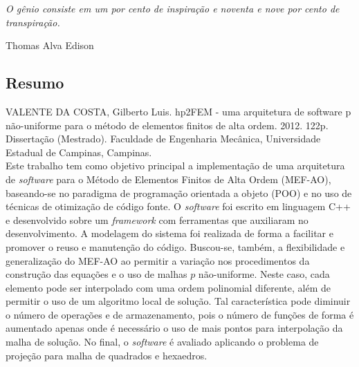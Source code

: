 \clearpage
\setcounter{page}{11}

\vspace*{6in}
\epigraph{\emph{O gênio consiste em um por cento de inspiração e noventa e nove por cento de
transpiração.}}{Thomas Alva Edison}


\clearpage
\setcounter{page}{13}

\begin{center}
\chapter*{Resumo}
\end{center}
\vspace{24pt}
\onehalfspacing
\noindent
VALENTE DA COSTA, Gilberto Luis. hp2FEM - uma arquitetura de software p não-uniforme para o método
de elementos finitos de alta ordem. 2012. 122p. Dissertação (Mestrado). Faculdade de Engenharia
Mecânica, Universidade Estadual de Campinas, Campinas.\\

Este trabalho tem como objetivo principal a implementação de uma arquitetura de \textit{software}
para o Método de Elementos Finitos de Alta Ordem (MEF-AO), baseando-se no paradigma de programação
orientada a objeto (POO) e no uso de técnicas de otimização de código fonte. O \textit{software} foi
escrito em linguagem C++ e desenvolvido sobre um \textit{framework} com ferramentas que auxiliaram
no desenvolvimento. A modelagem do sistema foi realizada de forma a facilitar e promover o reuso e
manutenção do código. Buscou-se, também, a flexibilidade e generalização do MEF-AO ao permitir a
variação nos procedimentos da construção das equações e o uso de malhas $p$ não-uniforme. Neste
caso, cada elemento pode ser interpolado com uma ordem polinomial diferente, além de permitir o uso
de um algoritmo local de solução. Tal característica pode diminuir o número de operações e de
armazenamento, pois o número de funções de forma é aumentado apenas onde é necessário o uso de mais
pontos para interpolação da malha de solução. No final, o \textit{software} é avaliado aplicando o
problema de projeção para malha de quadrados e hexaedros.\\

